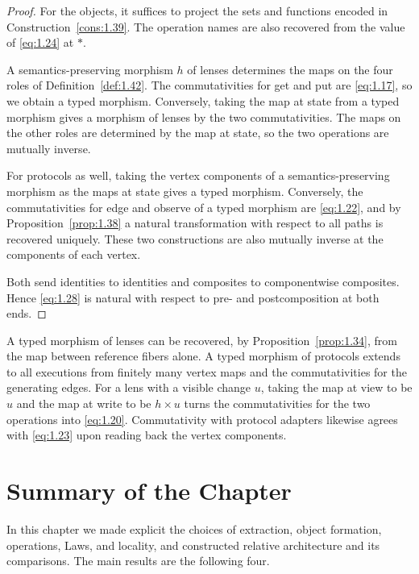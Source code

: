 \begin{proof}

For the objects, it suffices to project the sets and functions encoded in
Construction~\ref{cons:1.39}.
The operation names are also recovered from the value of \eqref{eq:1.24} at
$*$.

A semantics-preserving morphism $h$ of lenses determines the maps on the four
roles of Definition~\ref{def:1.42}.
The commutativities for get and put are \eqref{eq:1.17}, so we obtain a typed
morphism.
Conversely, taking the map at state from a typed morphism gives a morphism of
lenses by the two commutativities.
The maps on the other roles are determined by the map at state, so the two
operations are mutually inverse.

For protocols as well, taking the vertex components of a semantics-preserving
morphism as the maps at state gives a typed morphism.
Conversely, the commutativities for edge and observe of a typed morphism are
\eqref{eq:1.22}, and by Proposition~\ref{prop:1.38} a natural transformation
with respect to all paths is recovered uniquely.
These two constructions are also mutually inverse at the components of each
vertex.

Both send identities to identities and composites to componentwise composites.
Hence \eqref{eq:1.28} is natural with respect to pre- and postcomposition at
both ends.

\end{proof}

A typed morphism of lenses can be recovered, by Proposition~\ref{prop:1.34},
from the map between reference fibers alone.
A typed morphism of protocols extends to all executions from finitely many
vertex maps and the commutativities for the generating edges.
For a lens with a visible change $u$, taking the map at view to be $u$ and the
map at write to be $h\times u$ turns the commutativities for the two
operations into \eqref{eq:1.20}.
Commutativity with protocol adapters likewise agrees with \eqref{eq:1.23} upon
reading back the vertex components.

\section*{Summary of the Chapter}

In this chapter we made explicit the choices of extraction, object formation,
operations, Laws, and locality, and constructed relative architecture and its
comparisons. The main results are the following four.

